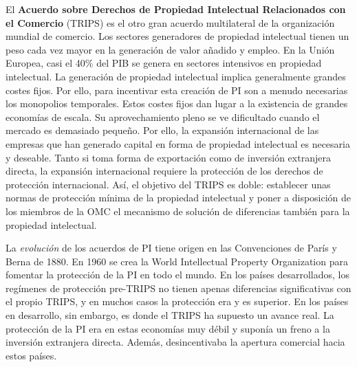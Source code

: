 \documentclass{nuevotema}
\begin{document}
El \textbf{Acuerdo sobre Derechos de Propiedad Intelectual Relacionados con el Comercio} (TRIPS) es el otro gran acuerdo multilateral de la organización mundial de comercio. Los sectores generadores de propiedad intelectual tienen un peso cada vez mayor en la generación de valor añadido y empleo. En la Unión Europea, casi el 40\% del PIB se genera en sectores intensivos en propiedad intelectual. La generación de propiedad intelectual implica generalmente grandes costes fijos. Por ello, para incentivar esta creación de PI son a menudo necesarias los monopolios temporales. Estos costes fijos dan lugar a la existencia de grandes economías de escala. Su aprovechamiento pleno se ve dificultado cuando el mercado es demasiado pequeño. Por ello, la expansión internacional de las empresas que han generado capital en forma de propiedad intelectual es necesaria y deseable. Tanto si toma forma de exportación como de inversión extranjera directa, la expansión internacional requiere la protección de los derechos de protección internacional. Así, el objetivo del TRIPS es doble: establecer unas normas de protección mínima de la propiedad intelectual y poner a disposición de los miembros de la OMC el mecanismo de solución de diferencias también para la propiedad intelectual.

La \textit{evolución} de los acuerdos de PI tiene origen en las Convenciones de París y Berna de 1880. En 1960 se crea la World Intellectual Property Organization para fomentar la protección de la PI en todo el mundo. En los países desarrollados, los regímenes de protección pre-TRIPS no tienen apenas diferencias significativas con el propio TRIPS, y en muchos casos la protección era y es superior. En los países en desarrollo, sin embargo, es donde el TRIPS ha supuesto un avance real. La protección de la PI era en estas economías muy débil y suponía un freno a la inversión extranjera directa. Además, desincentivaba la apertura comercial hacia estos países. 
\end{document}
